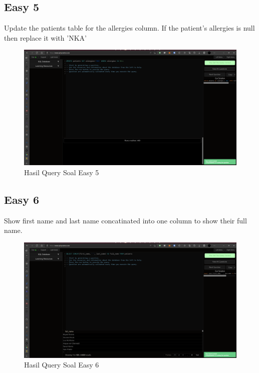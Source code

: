 \documentclass[]{article}
\begin{document}
\subsection{Easy 5}
Update the patients table for the allergies column. If the patient's allergies is null then replace it with 'NKA'

\begin{figure}[H]
    \centering
    \includegraphics[width=12cm]{easy-5.png}
    \caption{Hasil Query Soal Easy 5}
\end{figure}
\subsection{Easy 6}
Show first name and last name concatinated into one column to show their full name.

\begin{figure}[H]
    \centering
    \includegraphics[width=12cm]{easy-6.png}
    \caption{Hasil Query Soal Easy 6}
\end{figure}
\end{document}
